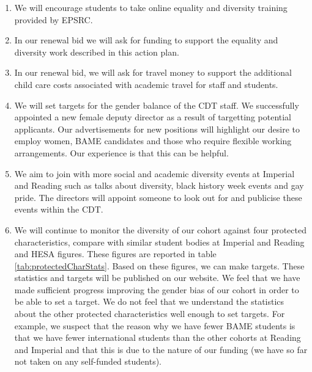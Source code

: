 \documentclass[12pt]{article}
\begin{document}
\begin{enumerate}
\item We will encourage students to take online equality and diversity training provided by EPSRC.

\item In our renewal bid we will ask for funding to support the equality and diversity work described in this action plan.

\item In our renewal bid, we will ask for travel money to support the additional child care costs associated with academic travel for staff and students. 

\item We will set targets for the gender balance of the CDT staff. We successfully appointed a new female deputy director as a result of targetting potential applicants. Our advertisements for new positions will highlight our desire to employ women, BAME candidates and those who require flexible working arrangements. Our experience is that this can be helpful. 

\item We aim to join with more social and academic diversity events at Imperial and Reading such as talks about diversity, black history week events and gay pride. The directors will appoint someone to look out for and publicise these events within the CDT.

\item We will continue to monitor the diversity of our cohort against four protected characteristics, compare with similar student bodies at Imperial and Reading and HESA figures. These figures are reported in table \ref{tab:protectedCharStats}. Based on these figures, we can make targets. These statistics and targets will be published on our website. We feel that we have made sufficient progress improving the gender bias of our cohort in order to be able to set a target. We do not feel that we understand the statistics about the other protected characteristics well enough to set targets. For example, we suspect that the reason why we have fewer BAME students is that we have fewer international students than the other cohorts at Reading and Imperial and that this is due to the nature of our funding (we have so far not taken on any self-funded students). 


\end{enumerate}
\end{document}
